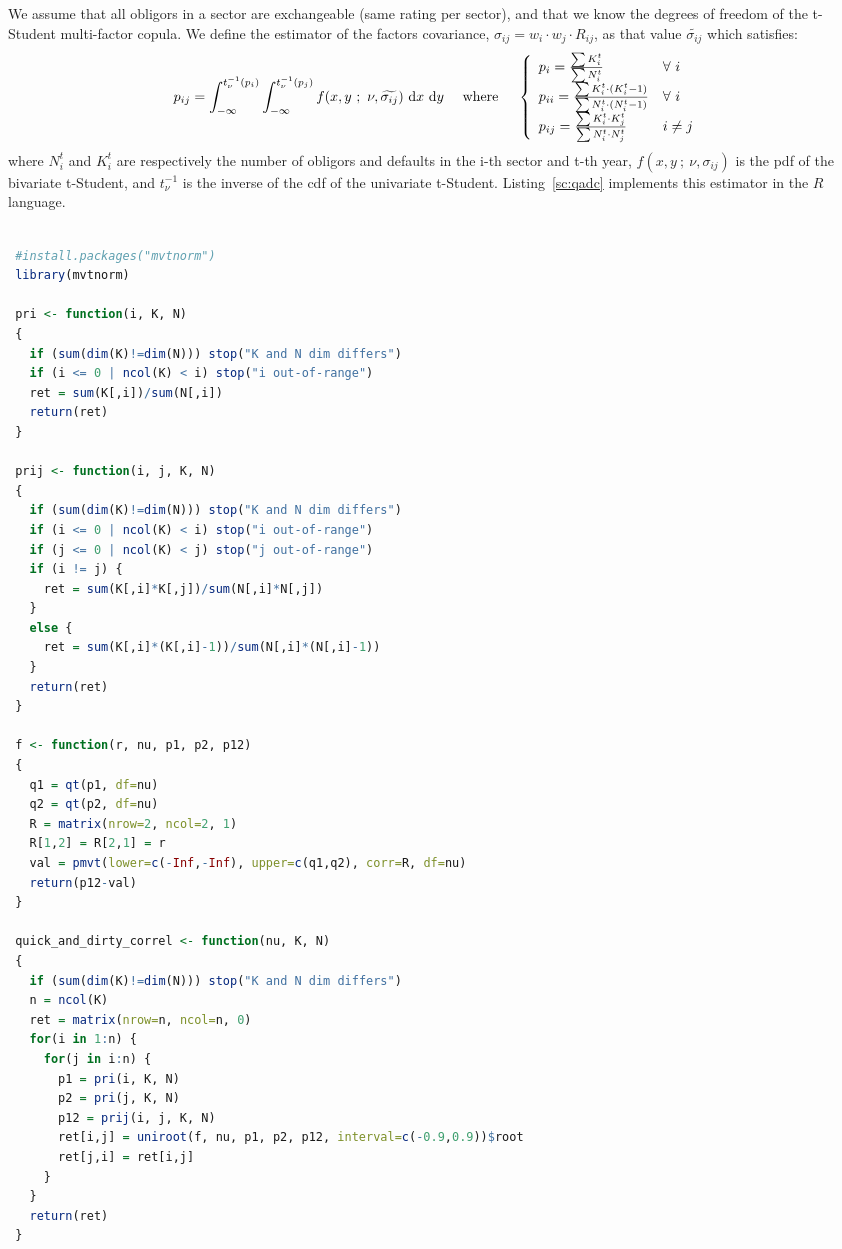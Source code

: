 \documentclass[11pt,fleqn]{book} %
\begin{document}
\begin{definition}
	We assume that all obligors in a sector are exchangeable (same rating per
	sector), and that we know the degrees of freedom of the t-Student 
	multi-factor copula. We define the estimator of the factors covariance, 
	$\sigma_{ij} = w_i \cdot w_j \cdot R_{ij}$, as that value 
	$\widetilde{\sigma_{ij}}$ which satisfies:
	\begin{displaymath}
		p_{ij} = \displaystyle \int_{-\infty}^{t_{\nu}^{-1}(p_i)} \int_{-\infty}^{t_{\nu}^{-1}(p_j)} 
		f(x,y\ ;\ \nu, \widetilde{\sigma_{ij}}) \mathop{\,\mathrm{{}d}}\mathopen{} x \mathop{\,\mathrm{{}d}}\mathopen{} y
		\quad \text{ where } \quad
		\left\{
			\begin{array}{ll}
				p_i = \frac{\sum K_i^t}{\sum N_i^t} & \forall\ i \\
				p_{ii} = \frac{\sum K_i^t \cdot (K_i^t-1)}{\sum N_i^t \cdot (N_i^t-1)} & \forall\ i \\
				p_{ij} = \frac{\sum K_i^t \cdot K_j^t}{\sum N_i^t \cdot N_j^t} & i \ne j \\
			\end{array}
		\right.
	\end{displaymath}
	where $N_i^t$ and $K_i^t$ are respectively the number of obligors and 
	defaults in the i-th sector and t-th year, $f(x,y\ ;\ \nu,\sigma_{ij})$ 
	is the pdf of the bivariate t-Student, and $t_{\nu}^{-1}$ is the inverse 
	of the cdf of the univariate t-Student. Listing~\ref{sc:qadc} implements 
	this estimator in the $R$ language.
\end{definition}

\begin{lstlisting}[language=R, label=sc:qadc, caption=Quick-and-dirty correlation (R script)]

 #install.packages("mvtnorm")
 library(mvtnorm)

 pri <- function(i, K, N)
 {
   if (sum(dim(K)!=dim(N))) stop("K and N dim differs")
   if (i <= 0 | ncol(K) < i) stop("i out-of-range")
   ret = sum(K[,i])/sum(N[,i])
   return(ret)
 }

 prij <- function(i, j, K, N)
 {
   if (sum(dim(K)!=dim(N))) stop("K and N dim differs")
   if (i <= 0 | ncol(K) < i) stop("i out-of-range")
   if (j <= 0 | ncol(K) < j) stop("j out-of-range")
   if (i != j) {
     ret = sum(K[,i]*K[,j])/sum(N[,i]*N[,j])
   }
   else {
     ret = sum(K[,i]*(K[,i]-1))/sum(N[,i]*(N[,i]-1))
   }
   return(ret)
 }

 f <- function(r, nu, p1, p2, p12)
 {
   q1 = qt(p1, df=nu)
   q2 = qt(p2, df=nu)
   R = matrix(nrow=2, ncol=2, 1)
   R[1,2] = R[2,1] = r
   val = pmvt(lower=c(-Inf,-Inf), upper=c(q1,q2), corr=R, df=nu)
   return(p12-val)
 }

 quick_and_dirty_correl <- function(nu, K, N)
 {
   if (sum(dim(K)!=dim(N))) stop("K and N dim differs")
   n = ncol(K)
   ret = matrix(nrow=n, ncol=n, 0)
   for(i in 1:n) {
     for(j in i:n) {
       p1 = pri(i, K, N)
       p2 = pri(j, K, N)
       p12 = prij(i, j, K, N)
       ret[i,j] = uniroot(f, nu, p1, p2, p12, interval=c(-0.9,0.9))$root
       ret[j,i] = ret[i,j]
     }
   }
   return(ret)
 }

\end{lstlisting}
\end{document}
